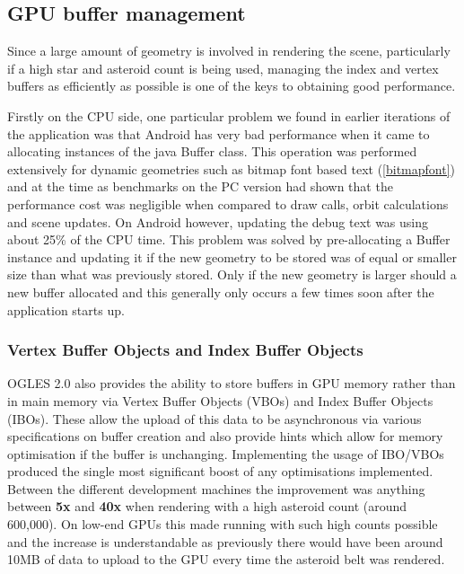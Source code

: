 \subsection{GPU buffer management}

Since a large amount of geometry is involved in rendering the scene, particularly if a high star and asteroid count is being used, managing the index and vertex buffers as efficiently as possible is one of the keys to obtaining good performance. 

Firstly on the CPU side, one particular problem we found in earlier iterations of the application was that Android has very bad performance when it came to allocating instances of the java Buffer class. 
This operation was performed extensively for dynamic geometries such as bitmap font based text (\cref{bitmapfont}) and at the time as benchmarks on the PC version had shown that the performance cost was negligible when compared to draw calls, orbit calculations and scene updates. On Android however, updating the debug text was using about 25\% of the CPU time. 
This problem was solved by pre-allocating a Buffer instance and updating it if the new geometry to be stored was of equal or smaller size than what was previously stored. 
Only if the new geometry is larger should a new buffer allocated and this generally only occurs a few times soon after the application starts up.

\subsubsection{Vertex Buffer Objects and Index Buffer Objects}
\label{vboibo}

OGLES 2.0 also provides the ability to store buffers in GPU memory rather than in main memory via Vertex Buffer Objects (VBOs) and Index Buffer Objects (IBOs). These allow the upload of this data to be asynchronous via various specifications on buffer creation and also provide hints which allow for memory optimisation if the buffer is unchanging. Implementing the usage of IBO/VBOs produced the single most significant boost of any optimisations implemented. Between the different development machines the improvement was anything between \textbf{5x} and \textbf{40x} when rendering with a high asteroid count (around 600,000). On low-end GPUs this made running with such high counts possible and the increase is understandable as previously there would have been around 10MB of data to upload to the GPU every time the asteroid belt was rendered.

